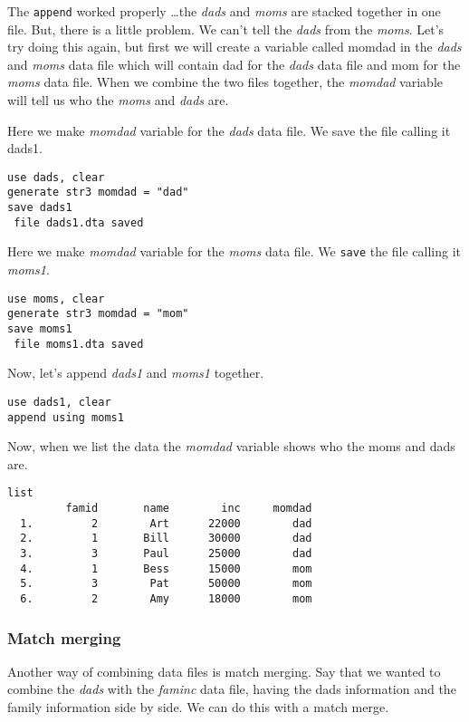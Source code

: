 The \lstinline{append} worked properly \ldots the \textit{dads} and \textit{moms} are stacked together in one file. But, there is a little problem. We can't tell the \textit{dads} from the \textit{moms}. Let's try doing this again, but first we will create a variable called momdad in the \textit{dads} and \textit{moms} data file which will contain dad for the \textit{dads} data file and mom for the \textit{moms} data file. When we combine the two files together, the \textit{momdad} variable will tell us who the \textit{moms} and \textit{dads} are.

Here we make \textit{momdad} variable for the \textit{dads} data file. We save the file calling it dads1.

\begin{lstlisting}
use dads, clear
generate str3 momdad = "dad"
save dads1
 file dads1.dta saved
\end{lstlisting}

Here we make \textit{momdad} variable for the \textit{moms} data file. We \lstinline{save} the file calling it \textit{moms1}.

\begin{lstlisting}
use moms, clear
generate str3 momdad = "mom"
save moms1
 file moms1.dta saved
\end{lstlisting}

Now, let's append \textit{dads1} and \textit{moms1} together.

\begin{lstlisting}
use dads1, clear
append using moms1
\end{lstlisting}

Now, when we list the data the \textit{momdad} variable shows who the moms and dads are.

\begin{lstlisting}
list
         famid       name        inc     momdad
  1.         2        Art      22000        dad
  2.         1       Bill      30000        dad
  3.         3       Paul      25000        dad
  4.         1       Bess      15000        mom
  5.         3        Pat      50000        mom
  6.         2        Amy      18000        mom
\end{lstlisting}

\subsubsection{Match merging}

Another way of combining data files is match merging. Say that we wanted to combine the \textit{dads} with the \textit{faminc} data file, having the dads information and the family information side by side. We can do this with a match merge.


